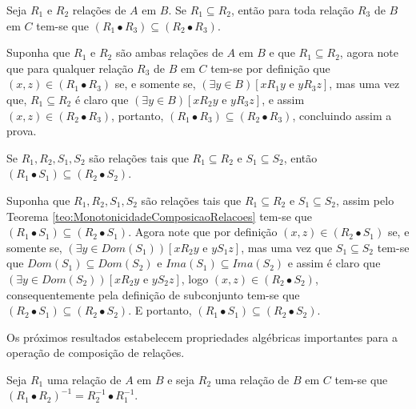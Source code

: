 \begin{teorema}\label{teo:MonotonicidadeComposicaoRelacoes}
	Seja $R_1$ e $R_2$ relações de $A$ em $B$. Se $R_1 \subseteq R_2$, então para toda relação $R_3$ de $B$ em $C$ tem-se que $(R_1 \bullet R_3) \subseteq (R_2 \bullet R_3)$.
\end{teorema}

\begin{prova}
	Suponha que $R_1$ e $R_2$ são ambas relações de $A$ em $B$ e que $R_1 \subseteq R_2$, agora note que para qualquer relação $R_3$ de $B$ em $C$ tem-se por definição que $(x, z) \in (R_1 \bullet R_3)$ se, e somente se, $(\exists y \in B)[x\mathrel{R_1}y \text{ e } y\mathrel{R_3}z]$, mas uma vez que, $R_1 \subseteq R_2$ é claro que $ (\exists y \in B)[x \mathrel{R_2}y \text{ e } y\mathrel{R_3}z]$, e assim $(x, z) \in (R_2 \bullet R_3)$, portanto, $(R_1 \bullet R_3) \subseteq (R_2 \bullet R_3)$, concluindo assim a prova.
\end{prova}

\begin{corolario}\label{col:MonotonicidadeComposicaoRelacoes}
	Se $R_1, R_2, S_1, S_2$ são relações tais que $R_1 \subseteq R_2$ e $S_1 \subseteq S_2$, então $(R_1 \bullet S_1) \subseteq (R_2 \bullet S_2)$.
\end{corolario}

\begin{prova}
	Suponha que $R_1, R_2, S_1, S_2$ são relações tais que $R_1 \subseteq R_2$ e $S_1 \subseteq S_2$, assim pelo Teorema \ref{teo:MonotonicidadeComposicaoRelacoes} tem-se que $(R_1 \bullet S_1) \subseteq (R_2 \bullet S_1)$. Agora note que por definição $(x, z) \in (R_2 \bullet S_1)$ se, e somente se, $(\exists y \in Dom(S_1))[x\mathrel{R_2}y \text{ e } y\mathrel{S_1}z]$, mas uma vez que $S_1 \subseteq S_2$ tem-se que $Dom(S_1) \subseteq Dom(S_2)$ e $Ima(S_1) \subseteq Ima(S_2)$ e assim é claro que $(\exists y \in Dom(S_2))[x\mathrel{R_2}y \text{ e } y\mathrel{S_2}z]$, logo $(x, z) \in (R_2 \bullet S_2)$, consequentemente pela definição de subconjunto tem-se que $(R_2 \bullet S_1) \subseteq (R_2 \bullet S_2)$. E portanto, $(R_1 \bullet S_1) \subseteq (R_2 \bullet S_2)$.
\end{prova}

Os próximos resultados estabelecem propriedades algébricas importantes para a operação de composição de relações.

\begin{teorema}\label{teo:PseudoMorganRelacoes}
	Seja $R_1$ uma relação de $A$ em $B$ e seja $R_2$ uma relação de $B$ em $C$ tem-se que $(R_1 \bullet R_2)^{-1} = R_2^{-1} \bullet R_1^{-1}$.
\end{teorema}

